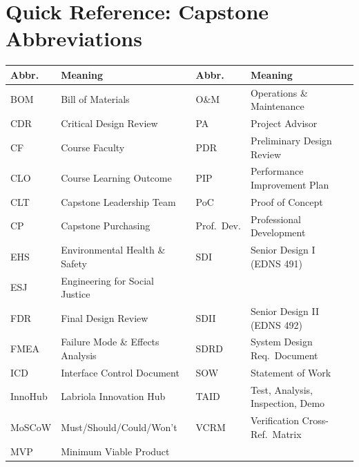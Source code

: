 \section{Quick Reference: Capstone Abbreviations}

\begin{center}\small
\begin{tabularx}{\textwidth}{lXlX}
\toprule
\textbf{Abbr.} & \textbf{Meaning} & \textbf{Abbr.} & \textbf{Meaning} \\
\midrule
BOM & Bill of Materials & O\&M & Operations \& Maintenance \\
CDR & Critical Design Review & PA & Project Advisor \\
CF & Course Faculty & PDR & Preliminary Design Review \\
CLO & Course Learning Outcome & PIP & Performance Improvement Plan \\
CLT & Capstone Leadership Team & PoC & Proof of Concept \\
CP & Capstone Purchasing & Prof.\ Dev. & Professional Development \\
EHS & Environmental Health \& Safety & SDI & Senior Design I (EDNS 491) \\
ESJ & Engineering for Social Justice & & \\
FDR & Final Design Review & SDII & Senior Design II (EDNS 492) \\
FMEA & Failure Mode \& Effects Analysis & SDRD & System Design Req.\ Document \\
ICD & Interface Control Document & SOW & Statement of Work \\
InnoHub & Labriola Innovation Hub & TAID & Test, Analysis, Inspection, Demo \\
MoSCoW & Must/Should/Could/Won't & VCRM & Verification Cross-Ref.\ Matrix \\
MVP & Minimum Viable Product & & \\
\bottomrule
\end{tabularx}
\end{center}



